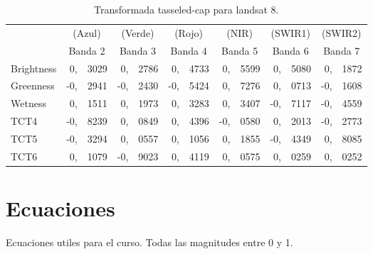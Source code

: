 \documentclass[hidelinks,12pt]{article}
\begin{document}
\begin{table}[htb]
    \centering
    \begin{tabular}{@{}lr@{}lr@{}lr@{}lr@{}lr@{}lr@{}l@{}}
        \toprule
                   & \multicolumn{2}{c}{(Azul)}  & \multicolumn{2}{c}{(Verde)} &
        \multicolumn{2}{c}{(Rojo)}  & \multicolumn{2}{c}{(NIR)}   &
        \multicolumn{2}{c}{(SWIR1)} & \multicolumn{2}{c}{(SWIR2)} \\
                   & \multicolumn{2}{c}{Banda 2} & \multicolumn{2}{c}{Banda 3} &
        \multicolumn{2}{c}{Banda 4} & \multicolumn{2}{c}{Banda 5} &
        \multicolumn{2}{c}{Banda 6} & \multicolumn{2}{c}{Banda 7} \\
        \midrule
        Brightness & 0,           & 3029         & 0,           & 2786         &
        0,           & 4733         & 0,           & 5599         & 0,
        & 5080         & 0,           & 1872         \\
        Greenness  & -0,          & 2941         & -0,          & 2430         &
        -0,          & 5424         & 0,           & 7276         & 0,
        & 0713         & -0,          & 1608         \\
        Wetness    & 0,           & 1511         & 0,           & 1973         &
        0,           & 3283         & 0,           & 3407         & -0,
        & 7117         & -0,          & 4559         \\
        TCT4       & -0,          & 8239         & 0,           & 0849         &
        0,           & 4396         & -0,          & 0580         & 0,
        & 2013         & -0,          & 2773         \\
        TCT5       & -0,          & 3294         & 0,           & 0557         &
        0,           & 1056         & 0,           & 1855         & -0,
        & 4349         & 0,           & 8085         \\
        TCT6       & 0,           & 1079         & -0,          & 9023         &
        0,           & 4119         & 0,           & 0575         & 0,
        & 0259         & 0,           & 0252         \\ \bottomrule
    \end{tabular}
    \caption{Transformada tasseled-cap para landsat 8.}
\end{table}
\pagebreak
\section{Ecuaciones}
Ecuaciones utiles para el curso. Todas las magnitudes entre 0 y 1.
\end{document}
